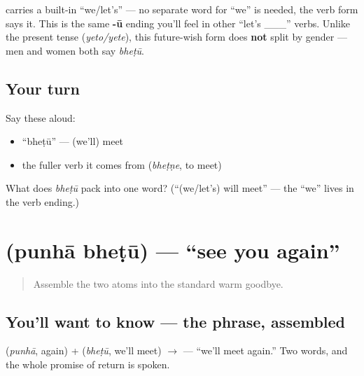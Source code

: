 \begin{grammarlens}[title={Grammar Lens: one verb, first-person-plural wish}]
\textbf{} carries a built-in \textquotedblleft{}we/let's\textquotedblright{} — no separate word for \textquotedblleft{}we\textquotedblright{} is needed, the verb form says it. This is the same \textbf{-ū} ending you'll feel in other \textquotedblleft{}let's \_\_\_\textquotedblright{} verbs. Unlike the present tense (\emph{yeto/yete}), this future-wish form does \textbf{not} split by gender — men and women both say \emph{bheṭū}.
\end{grammarlens}

\subsection*{Your turn}
Say these aloud:

\begin{itemize}
\raggedright
  \item \textquotedblleft{}bheṭū\textquotedblright{} — (we'll) meet
  \item the fuller verb it comes from (\emph{bheṭṇe}, to meet)
\end{itemize}

\begin{tcolorbox}[breakable,colback=teal!4,colframe=teal!35!black,title={Before you move on}]
What does \emph{bheṭū} pack into one word? (\textquotedblleft{}(we/let's) will meet\textquotedblright{} — the \textquotedblleft{}we\textquotedblright{} lives in the verb ending.)
\end{tcolorbox}
\section[\texorpdfstring{\mr{पुन्हा} \mr{भेटू} (punhā bheṭū)}{पुन्हा भेटू (punhā bheṭū)}]{  (punhā bheṭū) — \textquotedblleft{}see you again\textquotedblright{}}

\label{lesson:MR-C04-punha-bhetu}



\begin{quote}
Assemble the two atoms into the standard warm goodbye.
\end{quote}

\subsection*{You'll want to know — the phrase, assembled}
\textbf{} (\emph{punhā}, again) + \textbf{} (\emph{bheṭū}, we'll meet) $\to$ \textbf{ } — \textquotedblleft{}we'll meet again.\textquotedblright{} Two words, and the whole promise of return is spoken.

